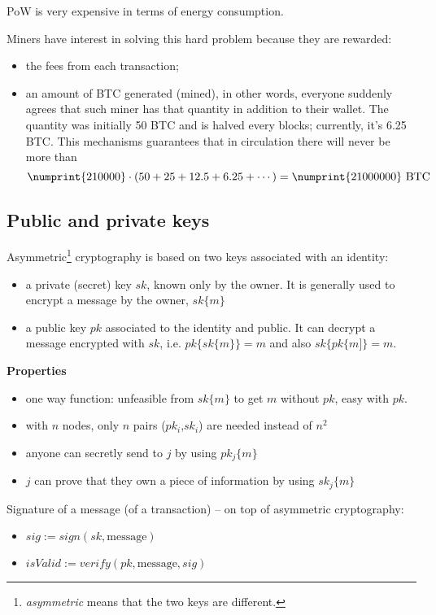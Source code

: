 PoW is very expensive in terms of energy consumption.

Miners have interest in solving this hard problem because they are rewarded:
\begin{itemize}
	\item the fees from each transaction;
	\item an amount of BTC generated (mined), in other words, everyone suddenly agrees that such miner has that quantity in addition to their wallet. The quantity was initially 50 BTC and is halved every  blocks; currently, it's 6.25 BTC. This mechanisms guarantees that in circulation there will never be more than
	\begin{equation*}
		\numprint{210000} \cdot (50+25+12.5+6.25+\cdots) = \numprint{21000000}\ \text{BTC}
	\end{equation*}
\end{itemize}

\subsection{Public and private keys}

Asymmetric\footnote{\textit{asymmetric} means that the two keys are different.} cryptography is based on two keys associated with an identity:
\begin{itemize}
	\item a private (secret) key $sk$, known only by the owner. It is generally used to encrypt a message by the owner, $sk\{m\}$
	\item a public key $pk$ associated to the identity and public. It can decrypt a message encrypted with $sk$, i.e. $pk\{sk\{m\}\} =m$ and also $sk\{pk\{m]\} =m$.
\end{itemize}

\textbf{Properties}
\begin{itemize}
	\item one way function: unfeasible from $sk\{m\}$ to get $m$ without $pk$, easy with $pk$.
	\item with $n$ nodes, only $n$ pairs ($pk_{i}$,$sk_{i}$) are needed instead of $n^{2}$
	\item anyone can secretly send to $j$ by using $pk_{j}\{m\}$
	\item $j$ can prove that they own a piece of information by using $sk_{j}\{m\}$
\end{itemize}

Signature of a message (of a transaction) – on top of asymmetric cryptography:
\begin{itemize}
	\item $sig:=sign(sk,\text{message})$
	\item $isValid:=verify(pk,\text{message},sig)$
\end{itemize}

